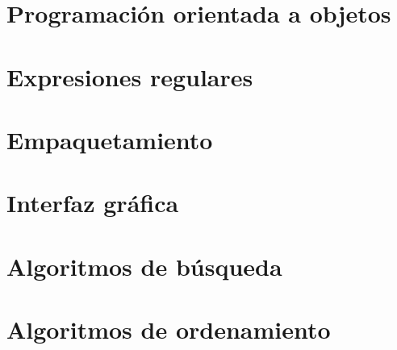 \documentclass{article}
\begin{document}
    \section{Programación orientada a objetos}

    \section{Expresiones regulares}

    \section{Empaquetamiento}

    \section{Interfaz gráfica}

    \section{Algoritmos de búsqueda}

    \section{Algoritmos de ordenamiento}
\end{document}
